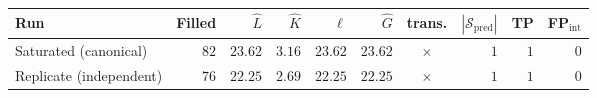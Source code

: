 \small
\setlength{\tabcolsep}{5pt}
\begin{tabular}{lrrrrrcrrr}
\toprule
Run                        & Filled & $\hat L$ & $\hat K$ & $\hat\ell$ & $\hat G$ & trans.   & $|\mathcal{S}_{\mathrm{pred}}|$ & TP & FP$_{\mathrm{int}}$ \\
\midrule
Saturated (canonical)      & $82$   & $23.62$ & $3.16$ & $23.62$ & $23.62$ & $\times$ & $1$ & $1$ & $0$ \\
Replicate (independent)    & $76$   & $22.25$ & $2.69$ & $22.25$ & $22.25$ & $\times$ & $1$ & $1$ & $0$ \\
\bottomrule
\end{tabular}
